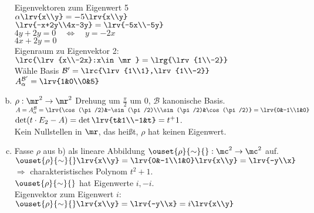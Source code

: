 \begin{enumerate}[a)]
      Eigenvektoren zum Eigenwert 5\\
      $\alpha\lrv{x\\y}=-5\lrv{x\\y}$\\
      $\lrv{-x+2y\\4x-3y}=\lrv{-5x\\-5y}$\\
      $4y+2y=0\quad\Leftrightarrow\quad y=-2x$\\
      $4x+2y=0$\\
      Eigenraum zu Eigenvektor 2:\\
      $\lrc{\lrv{x\\-2x}:x\in\mr}=\lrg{\lrv{1\\-2}}$\\
      Wähle Basis ${\mathcal{B}}'=\lrc{\lrv{1\\1},\lrv{1\\-2}}$\\
      $A_\alpha^{\mathcal{B}'}=\lrv{1&0\\0&5}$
    \item $\rho:\mr^2\rightarrow\mr^2$ Drehung um $\frac{\pi}{2}$ um $0$, ${\mathcal{B}}$ kanonische Basis.\\
      $A=A_\alpha^{\mathcal{B}}=\lrv{\cos(\pi/2)&-\sin(\pi/2)\\\sin(\pi/2)&\cos(\pi/2)}=\lrv{0&-1\\1&0}$\\
      $\det(t\cdot E_2-A)=\det\lrv{t&1\\-1&t}=t^+1$.\\
      Kein Nullstellen in $\mr$, das heißt, $\rho$ hat keinen Eigenwert.
    \item Fasse $\rho$ aus b) als lineare Abbildung $\ouset{\rho}{\sim}{}:\mc^2\rightarrow\mc^2$ auf.\\
    	  $\ouset{\rho}{\sim}{}\lrv{x\\y}=\lrv{0&-1\\1&0}\lrv{x\\y}=\lrv{-y\\x}$\\
    	  $\Rightarrow$ charakteristisches Polynom $t^2+1$.\\
    	  $\ouset{\rho}{\sim}{}$ hat Eigenwerte $i,-i$.\\
    	  Eigenvektor zum Eigenwert $i$: $\ouset{\rho}{\sim}{}\lrv{x\\y}=\lrv{-y\\x}=i\lrv{x\\y}$\\

\end{enumerate}
